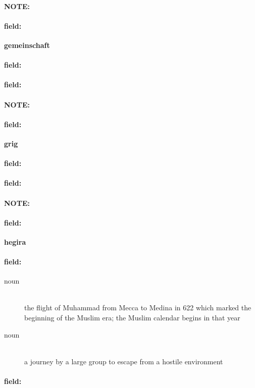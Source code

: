 \documentclass[12pt]{article}
\newenvironment{note}{\paragraph{NOTE:}}{}
\newenvironment{field}{\paragraph{field:}}{}
\begin{document}
\begin{note}
\begin{field}
\textbf{\large gemeinschaft}
\end{field}


\begin{field}
\end{field}

\begin{field}
\end{field}
\end{note}
\begin{note}
\begin{field}
\textbf{\large grig}
\end{field}


\begin{field}
\end{field}

\begin{field}
\end{field}
\end{note}
\begin{note}
\begin{field}
\textbf{\large hegira}
\end{field}


\begin{field}
\begin{description}
\item[noun] \hfill \\ 
the flight of Muhammad from Mecca to Medina in 622 which marked the beginning of the Muslim era; the Muslim calendar begins in that year

\item[noun] \hfill \\ 
a journey by a large group to escape from a hostile environment

\end{description}
\end{field}

\begin{field}
\end{field}
\end{note}
\end{document}
